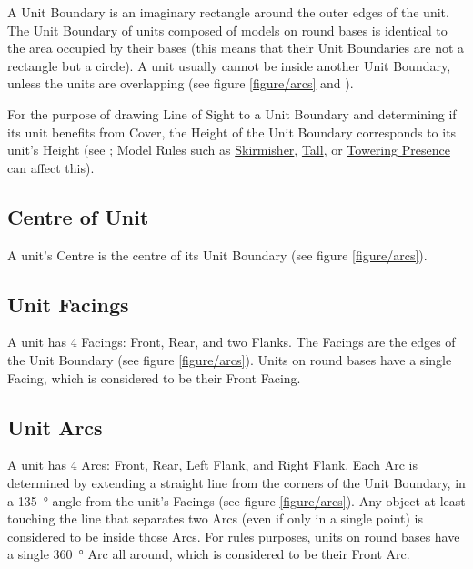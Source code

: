 A Unit Boundary is an imaginary rectangle around the outer edges of the unit. The Unit Boundary of units composed of models on round bases is identical to the area occupied by their bases (this means that their Unit Boundaries are not a rectangle but a circle).​
A unit usually cannot be inside another Unit Boundary, unless the units are overlapping (see figure \ref{figure/arcs} and ).

\columnbreak

For the purpose of drawing Line of Sight to a Unit Boundary and determining if its unit benefits from Cover, the Height of the Unit Boundary corresponds to its unit's Height (see ; Model Rules such as \hyperref[skirmisher]{Skirmisher}, \hyperref[tall]{Tall}, or \hyperref[towering_presence]{Towering Presence} can affect this).

\subsection{Centre of Unit}
\label{centre_of_unit}

A unit's Centre is the centre of its Unit Boundary (see figure \ref{figure/arcs}).

\subsection{Unit Facings}
\label{unit_facings}

A unit has 4 Facings: Front, Rear, and two Flanks. The Facings are the edges of the Unit Boundary (see figure \ref{figure/arcs}). Units on round bases have a single Facing, which is considered to be their Front Facing.

\subsection{Unit Arcs}
\label{unit_arcs}

A unit has 4 Arcs: Front, Rear, Left Flank, and Right Flank. Each Arc is determined by extending a straight line from the corners of the Unit Boundary, in a \SI{135}{\degree} angle from the unit's Facings (see figure \ref{figure/arcs}). Any object at least touching the line that separates two Arcs (even if only in a single point) is considered to be inside those Arcs. For rules purposes, units on round bases have a single \SI{360}{\degree} Arc all around, which is considered to be their Front Arc.

